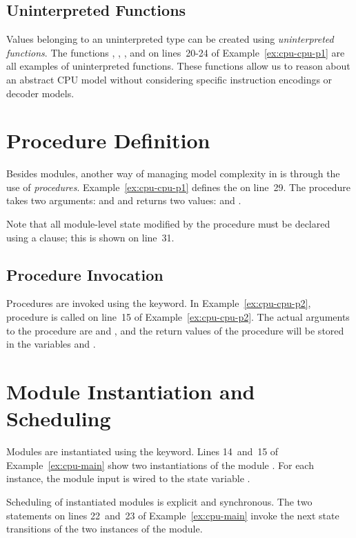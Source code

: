\subsection{Uninterpreted Functions}
Values belonging to an uninterpreted type can be created using \emph{uninterpreted functions}. The functions , , ,  and  on lines~20-24 of Example~\ref{ex:cpu-cpu-p1} are all examples of uninterpreted functions. These functions allow us to reason about an abstract CPU model without considering specific instruction encodings or decoder models.

\section{Procedure Definition}
Besides modules, another way of managing model complexity in \uclid{} is through the use of \emph{procedures}. Example~\ref{ex:cpu-cpu-p1} defines the   on line~29. The procedure takes two arguments:  and  and returns two values:  and .

Note that all module-level state modified by the procedure must be declared using a  clause; this is shown on line~31.

\subsection{Procedure Invocation}
Procedures are invoked using the  keyword. In Example~\ref{ex:cpu-cpu-p2}, procedure  is called on line~15 of Example~\ref{ex:cpu-cpu-p2}. The actual arguments to the procedure are  and , and the return values of the procedure will be stored in the variables  and .

\section{Module Instantiation and Scheduling}

Modules are instantiated using the  keyword. Lines 14~and~15 of Example~\ref{ex:cpu-main} show two instantiations of the module . For each instance, the module input  is wired to the state variable .

Scheduling of instantiated modules is explicit and synchronous. The two  statements on lines 22~and~23 of Example~\ref{ex:cpu-main} invoke the next state transitions of the two instances of the  module.

